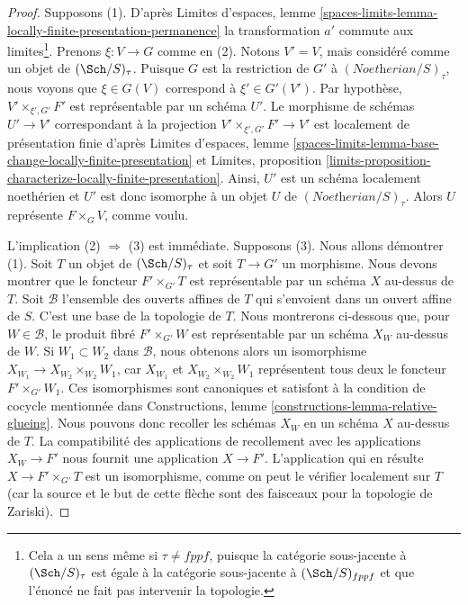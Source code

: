 \begin{proof}
Supposons (1). D'après Limites d'espaces, lemme
\ref{spaces-limits-lemma-locally-finite-presentation-permanence}
la transformation $a'$ commute aux limites\footnote{Cela a un sens même si
$\tau \not = fppf$, puisque la catégorie sous-jacente à $(\Sch/S)_\tau$ est
égale à la catégorie sous-jacente à $(\Sch/S)_{fppf}$ et que l'énoncé ne fait
pas intervenir la topologie.}. Prenons $\xi : V \to G$ comme en (2). Notons
$V' = V$, mais considéré comme un objet de $(\Sch/S)_\tau$. Puisque $G$ est la
restriction de $G'$ à $(\textit{Noetherian}/S)_\tau$, nous voyons que
$\xi \in G(V)$ correspond à $\xi' \in G'(V')$. Par hypothèse,
$V' \times_{\xi', G'} F'$ est représentable par un schéma $U'$. Le morphisme
de schémas $U' \to V'$ correspondant à la projection
$V' \times_{\xi', G'} F' \to V'$ est localement de présentation finie d'après
Limites d'espaces, lemme
\ref{spaces-limits-lemma-base-change-locally-finite-presentation} et
Limites, proposition
\ref{limits-proposition-characterize-locally-finite-presentation}.
Ainsi, $U'$ est un schéma localement noethérien et $U'$ est donc isomorphe à un
objet $U$ de $(\textit{Noetherian}/S)_\tau$. Alors $U$ représente
$F \times_G V$, comme voulu.

\medskip\noindent
L'implication (2) $\Rightarrow$ (3) est immédiate. Supposons (3). Nous allons
démontrer (1). Soit $T$ un objet de $(\Sch/S)_\tau$ et soit $T \to G'$ un
morphisme. Nous devons montrer que le foncteur $F' \times_{G'} T$ est
représentable par un schéma $X$ au-dessus de $T$. Soit $\mathcal{B}$ l'ensemble
des ouverts affines de $T$ qui s'envoient dans un ouvert affine de $S$. C'est
une base de la topologie de $T$. Nous montrerons ci-dessous que, pour
$W \in \mathcal{B}$, le produit fibré $F' \times_{G'} W$ est représentable par
un schéma $X_W$ au-dessus de $W$. Si $W_1 \subset W_2$ dans $\mathcal{B}$,
nous obtenons alors un isomorphisme
$X_{W_1} \to X_{W_2} \times_{W_2} W_1$, car $X_{W_1}$ et
$X_{W_2} \times_{W_2} W_1$ représentent tous deux le foncteur
$F' \times_{G'} W_1$. Ces isomorphismes sont canoniques et satisfont à la
condition de cocycle mentionnée dans Constructions, lemme
\ref{constructions-lemma-relative-glueing}. Nous pouvons donc recoller les
schémas $X_W$ en un schéma $X$ au-dessus de $T$. La compatibilité des
applications de recollement avec les applications $X_W \to F'$ nous fournit
une application $X \to F'$. L'application qui en résulte
$X \to F' \times_{G'} T$ est un isomorphisme, comme on peut le vérifier
localement sur $T$ (car la source et le but de cette flèche sont des faisceaux
pour la topologie de Zariski).


\end{proof}
